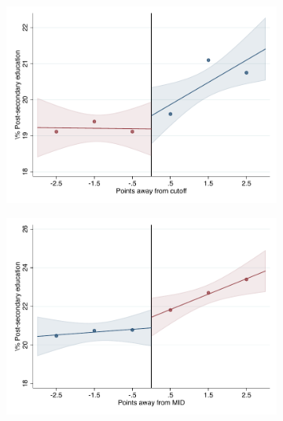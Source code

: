 \documentclass[oneside,11pt]{article}
\begin{document}
\begin{figure}[H]

    \ContinuedFloat
    \caption{(Cont.) RD plots for outcome variables across those assigned to IPN high-school, and those who are not\label{fig:ITT_rd_plot_IPN_5}}
    \begin{center}
    
    \begin{subfigure}{0.475\textwidth}
        \centering
        \includegraphics[width=\textwidth]{04_Figures/rd_plot_tau_licenciatura_mas_IPN3.pdf}
    \end{subfigure}
    \begin{subfigure}{0.475\textwidth}
        \centering
        \includegraphics[width=\textwidth]{04_Figures/rd_plot_mid_licenciatura_mas_IPN3.pdf}
    \end{subfigure}


\end{center}
\end{figure}
\end{document}
